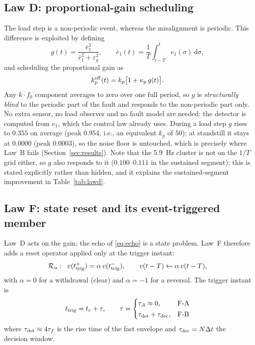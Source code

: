 \documentclass[journal]{IEEEtran}
\theoremstyle{remark}
\begin{document}
\subsection{Law D: proportional-gain scheduling}\label{sec:lawd}
The load step is a non-periodic event, whereas the misalignment is periodic. This
difference is exploited by defining
\begin{equation}
g(t)=\frac{\bar e_1^2}{\bar e_1^2+\varepsilon_g^2},\qquad
\bar e_1(t)=\frac{1}{T}\int_{t-T}^{t}e_1(\sigma)\,\mathrm d\sigma ,
\label{eq:det}
\end{equation}
and scheduling the proportional gain as
\begin{equation}
k_p^{\rm eff}(t)=k_p\big[1+\kappa_p\,g(t)\big].
\label{eq:lawd}
\end{equation}
Any $k\cdot f_0$ component averages to zero over one full period, so $g$ is
\emph{structurally blind} to the periodic part of the fault and responds to the
non-periodic part only. No extra sensor, no load observer and no fault model are
needed: the detector is computed from $e_1$, which the control law already uses.
During a load step $g$ rises to $0.355$ on average (peak $0.954$, i.e., an equivalent
$k_p$ of $50$); at standstill it stays at $0.0000$ (peak $0.0003$), so the noise floor
is untouched, which is precisely where Law~B fails (Section~\ref{sec:results}).
Note that the 5.9~Hz cluster is not on the $1/T$ grid either, so $g$ also responds to
it ($0.100$--$0.111$ in the sustained segment); this is stated explicitly rather than
hidden, and it explains the sustained-segment improvement in Table~\ref{tab:lawd}.

\subsection{Law F: state reset and its event-triggered member}\label{sec:lawf}
Law~D acts on the gain; the echo of \eqref{eq:echo} is a state problem. Law~F
therefore adds a reset operator applied only at the trigger instant:
\begin{equation}
\mathcal R_\alpha:\;\; v(t_{\rm trig}^+)=\alpha\,v(t_{\rm trig}^-),\qquad
v(t-T)\leftarrow\alpha\,v(t-T),
\label{eq:reset}
\end{equation}
with $\alpha=0$ for a withdrawal (clear) and $\alpha=-1$ for a reversal. The trigger
instant is
\begin{equation}
t_{\rm trig}=t_e+\tau,\qquad
\tau=\begin{cases}\tau_A\approx0, & \text{F-A}\\[0.6mm]
\tau_{\rm det}+\tau_{\rm dec}, & \text{F-B}\end{cases}
\label{eq:trig}
\end{equation}
where $\tau_{\rm det}\approx4\tau_f$ is the rise time of the fast envelope and
$\tau_{\rm dec}=N\Delta t$ the decision window.
\end{document}
